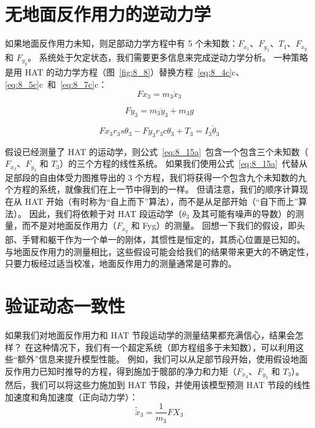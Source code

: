 \section{无地面反作用力的逆动力学}

如果地面反作用力未知，则足部动力学方程中有 5 个未知数：$F_{x_1}$、$F_{y_1}$、$T_1$、$F_{x_g}$ 和 $F_{y_g}$。
系统处于欠定状态，我们需要更多信息来完成逆动力学分析。
一种策略是用 HAT 的动力学方程（图~\ref{fig:8_8}）替换方程~\ref{eq:8_4c}c、\ref{eq:8_5c}c~和~\ref{eq:8_7c}c：
%
\begin{equation}
	F x_3 = m_3 \ddot{x}_3
	\label{eq:8_15a}
\end{equation}

\begin{equation}
	F y_3 = m_3 \ddot{y}_3  +  m_3 g
	\label{eq:8_15b}
\end{equation}

\begin{equation}
	F x_3 r_3 s \theta_3 -
	F y_3 r_3 c \theta_3 + 
	T_3
	= I_3 \ddot{\theta}_3
	\label{eq:8_15c}
\end{equation}


假设已经测量了 HAT 的运动学，则公式~\ref{eq:8_15a}~包含一个包含三个未知数（$F_{x_3}$、$F_{y_3}$ 和 $T_3$）的三个方程的线性系统。
如果我们使用公式~\ref{eq:8_15a}~代替从足部段的自由体受力图推导出的 3 个方程，我们将获得一个包含九个未知数的九个方程的系统，就像我们在上一节中得到的一样。
但请注意，我们的顺序计算现在从 HAT 开始（有时称为“自上而下”算法），而不是从足部开始（“自下而上”算法）。
因此，我们将依赖于对 HAT 段运动学（$\theta_3$ 及其可能有噪声的导数）的测量，而不是对地面反作用力（$F_{x_g}$ 和 Fyg）的测量。
回想一下我们的假设，即头部、手臂和躯干作为一个单一的刚体，其惯性是恒定的，其质心位置是已知的。
与地面反作用力的测量相比，这些假设可能会给我们的结果带来更大的不确定性，只要力板经过适当校准，地面反作用力的测量通常是可靠的。


\section{验证动态一致性}

如果我们对地面反作用力和 HAT 节段运动学的测量结果都充满信心，结果会怎样？
在这种情况下，我们有一个超定系统（即方程组多于未知数），可以利用这些“额外”信息来提升模型性能。
例如，我们可以从足部节段开始，使用假设地面反作用力已知时推导的方程，得到施加于髋部的净力和力矩（$F_{x_3}$、$F_{y_3}$ 和 $T_3$）。
然后，我们可以将这些力施加到 HAT 节段，并使用该模型预测 HAT 节段的线性加速度和角加速度（正向动力学）：
%
\begin{equation}
	\tilde{\ddot{x}}_3  =  \frac{1}{m_3}  F X_3
	\label{eq:8_16a}
\end{equation}

